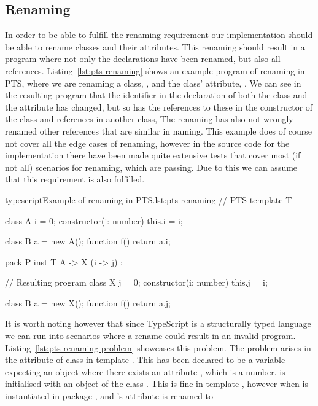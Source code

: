\subsection{Renaming}\label{subsec:pts-renaming}

In order to be able to fulfill the renaming requirement our implementation should be able to rename classes and their attributes.
This renaming should result in a program where not only the declarations have been renamed, but also all references.
Listing~\vref{lst:pts-renaming} shows an example program of renaming in PTS, where we are renaming a class, , and the class' attribute, .
We can see in the resulting program that the identifier in the declaration of both the class and the attribute has changed, but so has the references to these in the constructor of the class and references in another class, 
The renaming has also not wrongly renamed other references that are similar in naming.
This example does of course not cover all the edge cases of renaming, however in the source code for the implementation there have been made quite extensive tests that cover most (if not all) scenarios for renaming, which are passing.
Due to this we can assume that this requirement is also fulfilled.


\begin{code}{typescript}{Example of renaming in PTS.}{lst:pts-renaming}
    // PTS
    template T {
        class A {
            i = 0;
            constructor(i: number) {
                this.i = i;
            }
        }

        class B {
            a = new A();
            function f() {
                return a.i;
            }
        }
    }

    pack P {
        inst T { A -> X (i -> j) };
    }

    // Resulting program
    class X {
        j = 0;
        constructor(i: number) {
            this.j = i;
        }
    }

    class B {
        a = new X();
        function f() {
            return a.j;
        }
    }
\end{code}

It is worth noting however that since TypeScript is a structurally typed language we can run into scenarios where a rename could result in an invalid program.
Listing~\vref{lst:pts-renaming-problem} showcases this problem.
The problem arises in the  attribute of class  in template .
This has been declared to be a variable expecting an object where there exists an attribute , which is a number.
 is initialised with an object of the class .
This is fine in template , however when  is instantiated in package , and 's attribute  is renamed to 

